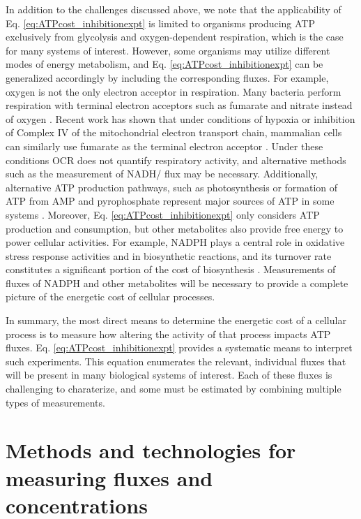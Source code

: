 \documentclass{compactarticle}
\begin{document}
In addition to the challenges discussed above, we note that the applicability of Eq. \ref{eq:ATPcost_inhibitionexpt} is limited to organisms producing ATP exclusively from glycolysis and oxygen-dependent respiration, which is the case for many systems of interest. However, some organisms may utilize different modes of energy metabolism, and Eq. \ref{eq:ATPcost_inhibitionexpt} can be generalized accordingly by including the corresponding fluxes. For example, oxygen is not the only electron acceptor in respiration. Many bacteria perform respiration with terminal electron acceptors such as fumarate and nitrate instead of oxygen \cite{jacobs1976}. Recent work has shown that under conditions of hypoxia or inhibition of Complex IV of the mitochondrial electron transport chain, mammalian cells can similarly use fumarate as the terminal electron acceptor \cite{spinelli2021}. Under these conditions OCR does not quantify respiratory activity, and alternative methods such as the measurement of NADH/ flux \cite{Yang2021elife} may be necessary. Additionally, alternative ATP production pathways, such as photosynthesis or formation of ATP from AMP and pyrophosphate represent major sources of ATP in some systems \cite{allen2002,james2016pyrophosphate}. Moreover, Eq. \ref{eq:ATPcost_inhibitionexpt} only considers ATP production and consumption, but other metabolites also provide free energy to power cellular activities. For example, NADPH plays a central role in oxidative stress response activities and in biosynthetic reactions, and its turnover rate constitutes a significant portion of the cost of biosynthesis \cite{salway2016metabolism,wu2011beneficial}. Measurements of fluxes of NADPH and other metabolites will be necessary to provide a complete picture of the energetic cost of cellular processes.

In summary, the most direct means to determine the energetic cost of a cellular process is to measure how altering the activity of that process impacts ATP fluxes. Eq. \ref{eq:ATPcost_inhibitionexpt} provides a systematic means to interpret such experiments. This equation enumerates the relevant, individual fluxes that will be present in many biological systems of interest. Each of these fluxes is challenging to charaterize, and some must be estimated by combining multiple types of measurements.


\section{Methods and technologies for measuring fluxes and concentrations}
\label{sec:methods}
\end{document}
